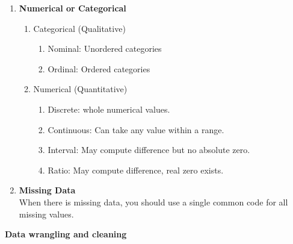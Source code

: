 \documentclass{article}
\begin{document}
\begin{enumerate}
\begin{enumerate}
    \end{enumerate}
    \item \textbf{Numerical or Categorical}
    \begin{enumerate}
        \item Categorical (Qualitative)
        \begin{enumerate}
            \item Nominal: Unordered categories 
            \item Ordinal: Ordered categories
        \end{enumerate}
        \item Numerical (Quantitative)
        \begin{enumerate}
            \item Discrete: whole numerical values.
            \item Continuous: Can take any value within a range.
            \item Interval: May compute difference but no absolute zero.
            \item Ratio: May compute difference, real zero exists.
        \end{enumerate}
    \end{enumerate}
    \item \textbf{Missing Data} \\
    When there is missing data, you should use a single common code for all missing values.
\end{enumerate}
\textbf{Data wrangling and cleaning}
\end{document}
